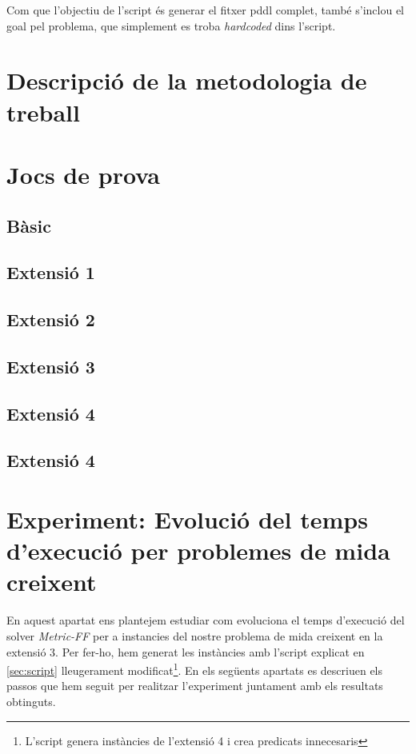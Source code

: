 \documentclass[11pt,a4paper]{article}
\begin{document}
Com que l'objectiu de l'script és generar el fitxer pddl complet, també s'inclou el goal pel problema, que simplement es troba \emph{hardcoded} dins l'script.

\section{Descripció de la metodologia de treball}


\section{Jocs de prova}
\subsection{Bàsic}
\subsection{Extensió 1}
\subsection{Extensió 2}
\subsection{Extensió 3}
\subsection{Extensió 4}
\subsection{Extensió 4}

\section[Experiment extra]{Experiment: Evolució del temps d'execució per problemes de mida creixent}
\label{sec:experiment}

En aquest apartat ens plantejem estudiar com evoluciona el temps d'execució del solver \emph{Metric-FF} per a instancies del nostre problema de mida creixent en la extensió 3. Per fer-ho, hem generat les instàncies amb l'script explicat en \ref{sec:script} lleugerament modificat\footnote{L'script genera instàncies de l'extensió 4 i crea predicats innecesaris}. En els següents apartats es descriuen els passos que hem seguit per realitzar l'experiment juntament amb els resultats obtinguts.
\end{document}
